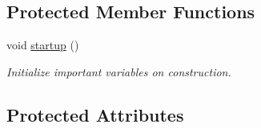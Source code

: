 \subsection*{Protected Member Functions}
\begin{DoxyCompactItemize}
\item 
void \mbox{\hyperlink{classforte_1_1_determinant_substitution_lists_a6301c6fb71410edb4ce093ffcda12a98}{startup}} ()
\begin{DoxyCompactList}\small\item\em Initialize important variables on construction. \end{DoxyCompactList}\end{DoxyCompactItemize}
\subsection*{Protected Attributes}
